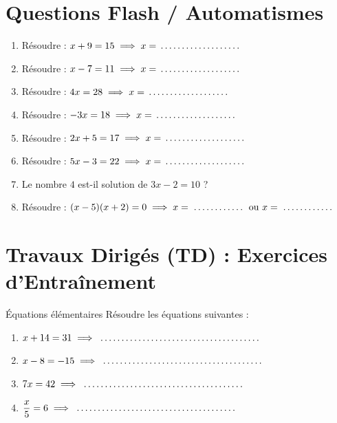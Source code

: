\section{Questions Flash / Automatismes}

\begin{automatisme}
\begin{enumerate}[label=\textbf{Q\arabic*.}]
    \item Résoudre : $x + 9 = 15 \implies x = \pointille[3cm]$
    \item Résoudre : $x - 7 = 11 \implies x = \pointille[3cm]$
    \item Résoudre : $4x = 28 \implies x = \pointille[3cm]$
    \item Résoudre : $-3x = 18 \implies x = \pointille[3cm]$
    \item Résoudre : $2x + 5 = 17 \implies x = \pointille[3cm]$
    \item Résoudre : $5x - 3 = 22 \implies x = \pointille[3cm]$
    \item Le nombre $4$ est-il solution de $3x - 2 = 10$ ? \pointille[3cm]
    \item Résoudre : $(x - 5)(x + 2) = 0 \implies x = \pointille[2cm] \text{ ou } x = \pointille[2cm]$
\end{enumerate}
\end{automatisme}

\section{Travaux Dirigés (TD) : Exercices d'Entraînement}

\begin{exercice}[2 pts]{\capRealiser}{Équations élémentaires}
Résoudre les équations suivantes :
\begin{enumerate}
    \item $x + 14 = 31 \implies \pointille[6cm]$
    \item $x - 8 = -15 \implies \pointille[6cm]$
    \item $7x = 42 \implies \pointille[6cm]$
    \item $\dfrac{x}{5} = 6 \implies \pointille[6cm]$
\end{enumerate}
\end{exercice}

